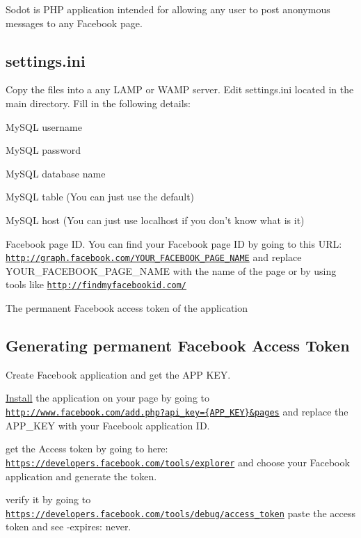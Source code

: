 Sodot is P\-H\-P application intended for allowing any user to post anonymous messages to any Facebook page.

\subsection*{settings.\-ini}

Copy the files into a any L\-A\-M\-P or W\-A\-M\-P server. Edit settings.\-ini located in the main directory. Fill in the following details\-:
\begin{DoxyItemize}
\item My\-S\-Q\-L username
\item My\-S\-Q\-L password
\item My\-S\-Q\-L database name
\item My\-S\-Q\-L table (You can just use the default)
\item My\-S\-Q\-L host (You can just use localhost if you don't know what is it)
\item Facebook page I\-D. You can find your Facebook page I\-D by going to this U\-R\-L\-: \href{http://graph.facebook.com/YOUR_FACEBOOK_PAGE_NAME}{\tt http\-://graph.\-facebook.\-com/\-Y\-O\-U\-R\-\_\-\-F\-A\-C\-E\-B\-O\-O\-K\-\_\-\-P\-A\-G\-E\-\_\-\-N\-A\-M\-E} and replace Y\-O\-U\-R\-\_\-\-F\-A\-C\-E\-B\-O\-O\-K\-\_\-\-P\-A\-G\-E\-\_\-\-N\-A\-M\-E with the name of the page or by using tools like \href{http://findmyfacebookid.com/}{\tt http\-://findmyfacebookid.\-com/}
\item The permanent Facebook access token of the application
\end{DoxyItemize}

\subsection*{Generating permanent Facebook Access Token}


\begin{DoxyItemize}
\item Create Facebook application and get the A\-P\-P K\-E\-Y.
\item \hyperlink{classInstall}{Install} the application on your page by going to \href{http://www.facebook.com/add.php?api_key={APP_KEY}&pages}{\tt http\-://www.\-facebook.\-com/add.\-php?api\-\_\-key=\{\-A\-P\-P\-\_\-\-K\-E\-Y\}\&pages} and replace the A\-P\-P\-\_\-\-K\-E\-Y with your Facebook application I\-D.
\item get the Access token by going to here\-: \href{https://developers.facebook.com/tools/explorer}{\tt https\-://developers.\-facebook.\-com/tools/explorer} and choose your Facebook application and generate the token.
\item verify it by going to \href{https://developers.facebook.com/tools/debug/access_token}{\tt https\-://developers.\-facebook.\-com/tools/debug/access\-\_\-token} paste the access token and see -\/expires\-: never.
\end{DoxyItemize}

